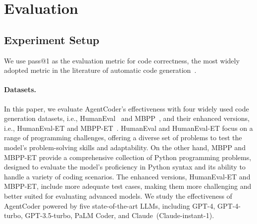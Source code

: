 \documentclass{article}
\newcommand{\xxx}{AgentCoder\xspace}
\begin{document}
\section{Evaluation}



\subsection{Experiment Setup}
\label{sec:experimentalsetup}
We use pass@1 as the evaluation metric for code correctness, the most widely adopted metric in the literature of automatic code generation~\cite{Austin2021ProgramSW,Chen2021EvaluatingLL,Dong2023CodeScoreEC,Zhang2023SelfEditFC,Dong2023SelfcollaborationCG}.
\paragraph{Datasets.} In this paper, we evaluate \xxx's effectiveness with four widely used code generation datasets, i.e., HumanEval~\cite{chen2021evaluating} and MBPP~\cite{Austin2021ProgramSW}, and their enhanced versions, i.e., HumanEval-ET and MBPP-ET~\cite{Dong2023CodeScoreEC}. HumanEval and HumanEval-ET focus on a range of programming challenges, offering a diverse set of problems to test the model's problem-solving skills and adaptability. On the other hand, MBPP and MBPP-ET provide a comprehensive collection of Python programming problems, designed to evaluate the model's proficiency in Python syntax and its ability to handle a variety of coding scenarios. The enhanced versions, HumanEval-ET and MBPP-ET, include more adequate test cases, making them more challenging and better suited for evaluating advanced models.
We study the effectiveness of \xxx powered by five state-of-the-art LLMs, including GPT-4, GPT-4-turbo, GPT-3.5-turbo, PaLM Coder, and Claude~(Claude-instant-1).
\end{document}
